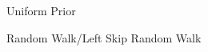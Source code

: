 \documentclass{beamer}
\begin{document}
\begin{frame}{Uniform Prior}

\end{frame}

\begin{frame}{Random Walk/Left Skip Random Walk}

\end{frame}









\end{document}

